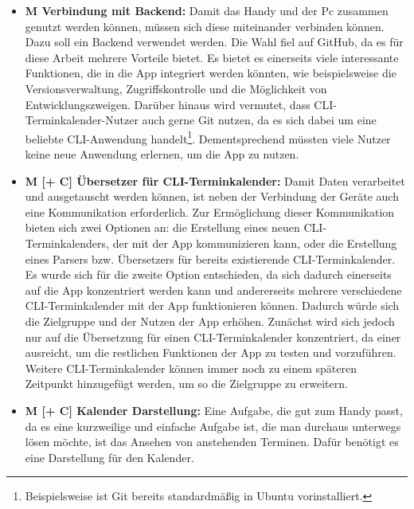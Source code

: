 \begin{itemize}
	\item \textbf{M Verbindung mit Backend:} %
		Damit das Handy und der Pc zusammen genutzt werden können, müssen sich diese miteinander verbinden können. Dazu soll ein Backend verwendet werden. Die Wahl fiel auf GitHub, da es für diese Arbeit mehrere Vorteile bietet. %
			Es bietet es einerseits viele interessante Funktionen, die in die App integriert werden könnten, wie beispielsweise die Versionsverwaltung, Zugriffskontrolle und die Möglichkeit von Entwicklungszweigen. %
			Darüber hinaus wird vermutet, dass CLI-Terminkalender-Nutzer auch gerne Git nutzen, da es sich dabei um eine beliebte CLI-Anwendung handelt\footnote{Beispielsweise ist Git bereits standardmäßig in Ubuntu vorinstalliert.\cite{nfA_ubuntuManifestGIT}}. Dementsprechend müssten viele Nutzer keine neue Anwendung erlernen, um die App zu nutzen.%
	\item \textbf{M [+ C] Übersetzer für CLI-Terminkalender:} %
		Damit Daten verarbeitet und ausgetauscht werden können, ist neben der Verbindung der Geräte auch eine Kommunikation erforderlich. %
			Zur Ermöglichung dieser Kommunikation bieten sich zwei Optionen an: die Erstellung eines neuen CLI-Terminkalenders, der mit der App kommunizieren kann, oder die Erstellung eines Parsers bzw. Übersetzers für bereits existierende CLI-Terminkalender.
				Es wurde sich für die zweite Option entschieden, da sich dadurch einerseits auf die App konzentriert werden kann und andererseits mehrere verschiedene CLI-Terminkalender mit der App funktionieren können. Dadurch würde sich die Zielgruppe und der Nutzen der App erhöhen.\newline%
		Zunächst wird sich jedoch nur auf die Übersetzung für einen CLI-Terminkalender konzentriert, da einer ausreicht, um die restlichen Funktionen der App zu testen und vorzuführen.%
		Weitere CLI-Terminkalender können immer noch zu einem späteren Zeitpunkt hinzugefügt werden, um so die Zielgruppe zu erweitern.%
	\item \textbf{M [+ C] Kalender Darstellung:} %
		Eine Aufgabe, die gut zum Handy passt, da es eine kurzweilige und einfache Aufgabe ist, die man durchaus unterwegs lösen möchte, ist das Ansehen von anstehenden Terminen. Dafür benötigt es eine Darstellung für den Kalender. %

\end{itemize}
